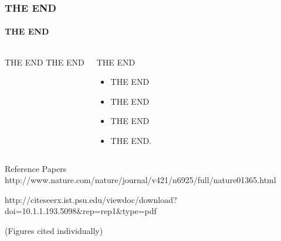 \documentclass{beamer}
\begin{document}

\begin{frame}
    \frametitle{THE END}
    \framesubtitle{THE END}
    \begin{block}{}
        \begin{columns}
                \begin{block}{THE END}
                    THE END
                \end{block}
                \begin{block}{THE END}
                    \begin{itemize}
                        \item THE END
                        \item THE END
                        \item THE END
                        \item THE END.
                    \end{itemize}
                \end{block}
        \end{columns}
    \end{block}
    \begin{block}{Reference Papers}
        \fontsize{6}{7.2}\selectfont
        http://www.nature.com/nature/journal/v421/n6925/full/nature01365.html

        http://citeseerx.ist.psu.edu/viewdoc/download?doi=10.1.1.193.5098\&rep=rep1\&type=pdf

        (Figures cited individually)
    \end{block}
\end{frame}
\end{document}
